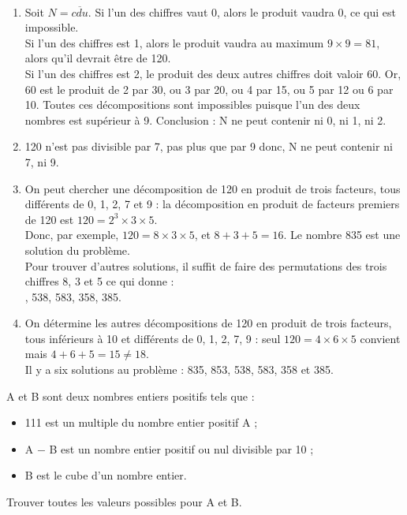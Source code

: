 \begin{corrige}
\ \\ [-5mm]
   \begin{enumerate}
      \item Soit $N=\overline{cdu}$. Si l'un des chiffres vaut 0, alors le produit vaudra 0, ce qui est  impossible. \\
         Si l'un des chiffres est 1, alors le produit vaudra au maximum $9\times9 =81$, alors qu'il devrait être de 120. \\
         Si l'un des chiffres est 2, le produit des deux autres chiffres doit valoir $60$. Or, 60 est le produit de 2 par 30, ou 3 par 20, ou 4 par 15, ou 5 par 12 ou 6 par 10. Toutes ces décompositions sont impossibles puisque l'un des deux nombres est supérieur à 9. Conclusion : {\blue N ne peut contenir ni 0, ni 1, ni 2.}
      \item 120 n'est pas divisible par 7, pas plus que par 9 donc, {\blue N ne peut contenir ni 7, ni 9.}
      \item On peut  chercher une décomposition de 120 en produit de trois facteurs, tous différents de 0, 1, 2, 7 et 9 : la décomposition en produit de facteurs premiers de 120 est $120 =2^3\times3\times5$. \\
         Donc, par exemple, $120 =8\times3\times5$, et $8+3+5 =16$. {\blue Le nombre 835 est une solution du problème.} \\
         Pour trouver d'autres solutions, il suffit de faire des permutations des trois chiffres 8, 3 et 5 ce qui donne : \\
         {, 538, 583, 358, 385.}
      \item On détermine les autres décompositions de 120 en produit de trois facteurs, tous inférieurs à 10 et différents de 0, 1, 2, 7, 9 : seul $120 =4\times6\times5$ convient mais $4+6+5 =15 \neq 18$. \\
         {\blue Il y a six solutions au problème : 835, 853, 538, 583, 358 et 385.}
   \end{enumerate}
\end{corrige}


\bigskip


\begin{exercice}[CRPE 2015 G1] %
   A et B sont deux nombres entiers positifs tels que :
   \begin{itemize}
      \item 111 est un multiple du nombre entier positif A ;
      \item A $-$ B est un nombre entier positif ou nul divisible par 10 ;
      \item B est le cube d'un nombre entier.
   \end{itemize}
   Trouver toutes les valeurs possibles pour A et B.
\end{exercice}

